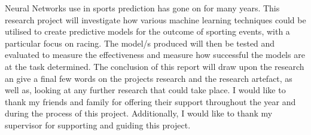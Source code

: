 \beforeabstract
{}
Neural Networks use in sports prediction has gone on for many years. This research project will investigate how various machine learning techniques could be utilised to create predictive models for the outcome of sporting events, with a particular focus on racing. The model/s produced will then be tested and evaluated to measure the effectiveness and measure how successful the models are at the task determined. The conclusion of this report will draw upon the research an give a final few words on the projects research and the research artefact, as well as, looking at any further research that could take place.
I would like to thank my friends and family for offering their support throughout the year and during the process of this project. Additionally, I would like to thank my supervisor for supporting and guiding this project.
\afterpreface \afterabstract
